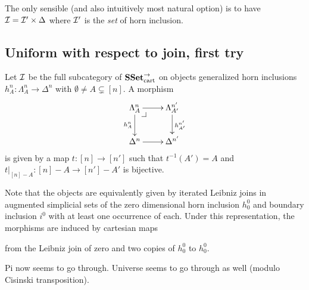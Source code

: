 \documentclass[reqno,10pt,a4paper,oneside]{amsart}
\begin{document}
The only sensible (and also intuitively most natural option) is to have $\cal{I} = \cal{I'} \times \Delta$ where $\cal{I'}$ is the \emph{set} of horn inclusion.

\subsection*{Uniform with respect to join, first try}

Let $\cal{I}$ be the full subcategory of $\SSet_{\text{cart}}^{\to}$ on objects generalized horn inclusions $h_A^n : \Lambda_A^n \to \Delta^n$ with $\emptyset \neq A \subsetneq [n]$.
A morphism
\[
\xymatrix{
  \Lambda_A^n
  \ar[r]
  \ar[d]_{h_A^n}
  \pullback{dr}
&
  \Lambda_{A'}^{n'}
  \ar[d]^{h_{A'}^{n'}}
\\
  \Delta^{n}
  \ar[r]
&
  \Delta^{n'}
}
\] 
is given by a map $t : [n] \to [n']$ such that $t^{-1}(A') = A$ and $t|_{[n] - A} : [n] - A \to [n'] - A'$ is bijective.


Note that the objects are equivalently given by iterated Leibniz joins in augmented simplicial sets of the zero dimensional horn inclusion $h_0^0$ and boundary inclusion $i^0$ with at least one occurrence of each.
Under this representation, the morphisms are induced by cartesian maps
from the Leibniz join of zero and two copies of $h_0^0$ to $h_0^0$.

Pi now seems to go through.
Universe seems to go through as well (modulo Cisinski transposition).
\end{document}
